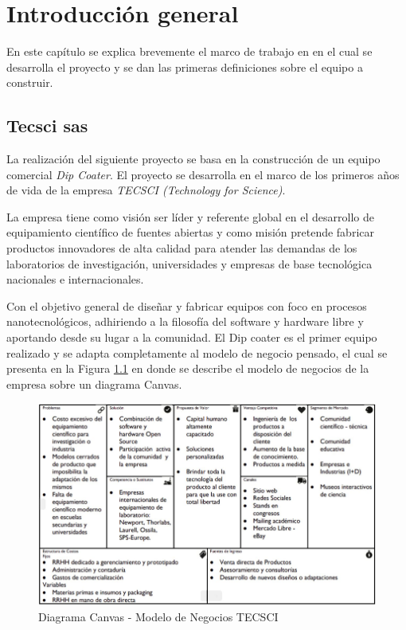 
\chapter{Introducción general} %

\label{Chapter1} %


En este capítulo se explica brevemente el marco de trabajo en en el cual se desarrolla el proyecto y se dan las primeras definiciones sobre el equipo a construir. 
\section{Tecsci sas}

La realización del siguiente proyecto se basa en la construcción de un equipo comercial \textit{Dip Coater}. El proyecto se desarrolla en el marco de los primeros años de vida de la empresa \textit{TECSCI (Technology for Science)}.

La empresa tiene como visión ser líder y referente global en el desarrollo de equipamiento científico de fuentes abiertas y como misión 
pretende fabricar productos innovadores de alta calidad para atender las demandas de los laboratorios de investigación, universidades y empresas de base tecnológica nacionales e internacionales.

Con el objetivo general de diseñar y fabricar equipos con foco en procesos nanotecnológicos, adhiriendo a la filosofía del software y hardware libre y aportando desde su lugar a la comunidad. El Dip coater es el primer equipo realizado y se adapta completamente al modelo de negocio pensado, el cual se presenta en la Figura \ref{fig:diagBloques} en donde se describe el modelo de negocios de la empresa sobre un diagrama Canvas.

\clearpage

\vspace{1cm}
\begin{figure}[htpb]
\centering 
\includegraphics[width=1\textwidth]{./Figures/canvas.png}
\caption{Diagrama Canvas - Modelo de Negocios TECSCI}
\label{fig:diagBloques}
\end{figure}
\vspace{1cm}


